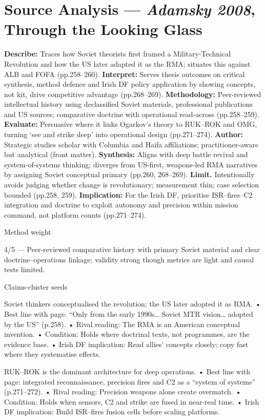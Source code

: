\section*{Source Analysis — \textit{Adamsky 2008}, Through the Looking Glass}
\textbf{Describe:} Traces how Soviet theorists first framed a Military-Technical Revolution and how the US later adapted it as the RMA; situates this against ALB and FOFA (pp.258–260).
\textbf{Interpret:} Serves thesis outcomes on critical synthesis, method defence and Irish DF policy application by showing concepts, not kit, drive competitive advantage (pp.268–269).
\textbf{Methodology:} Peer-reviewed intellectual history using declassified Soviet materials, professional publications and US sources; comparative doctrine with operational read-across (pp.258–259).
\textbf{Evaluate:} Persuasive where it links Ogarkov’s theory to RUK–ROK and OMG, turning ‘see and strike deep’ into operational design (pp.271–274).
\textbf{Author:} Strategic studies scholar with Columbia and Haifa affiliations; practitioner-aware but analytical (front matter).
\textbf{Synthesis:} Aligns with deep battle revival and system-of-systems thinking; diverges from US-first, weapons-led RMA narratives by assigning Soviet conceptual primacy (pp.260, 268–269).
\textbf{Limit.} Intentionally avoids judging whether change is revolutionary; measurement thin; case selection bounded (pp.258, 259).
\textbf{Implication:} For the Irish DF, prioritise ISR–fires–C2 integration and doctrine to exploit autonomy and precision within mission command, not platform counts (pp.271–274).

Method weight

4/5 — Peer-reviewed comparative history with primary Soviet material and clear doctrine–operations linkage; validity strong though metrics are light and causal tests limited.

Claims-cluster seeds

Soviet thinkers conceptualised the revolution; the US later adopted it as RMA.
• Best line with page: “Only from the early 1990s… Soviet MTR vision… adopted by the US” (p.258).
• Rival reading: The RMA is an American conceptual invention.
• Condition: Holds where doctrinal texts, not programmes, are the evidence base.
• Irish DF implication: Read allies’ concepts closely; copy fast where they systematise effects.

RUK–ROK is the dominant architecture for deep operations.
• Best line with page: integrated reconnaissance, precision fires and C2 as a “system of systems” (p.271–272).
• Rival reading: Precision weapons alone create overmatch.
• Condition: Holds when sensors, C2 and strike are fused in near-real time.
• Irish DF implication: Build ISR–fires fusion cells before scaling platforms.

